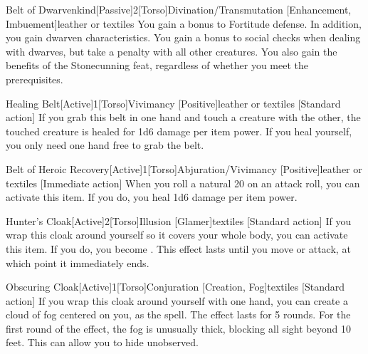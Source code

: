         \begin{magicitemdef}{Belt of Dwarvenkind}[Passive]{2}[Torso]{Divination/Transmutation [Enhancement, Imbuement]}{leather or textiles}
             You gain a  bonus to Fortitude defense.
            In addition, you gain dwarven characteristics.
            You gain a  bonus to social checks when dealing with dwarves, but take a  penalty with all other creatures.
            You also gain the benefits of the Stonecunning feat, regardless of whether you meet the prerequisites.
        \end{magicitemdef}

        \begin{magicitemdef}{Healing Belt}[Active]{1}[Torso]{Vivimancy [Positive]}{leather or textiles}
            [Standard action] If you grab this belt in one hand and touch a creature with the other, the touched creature is healed for 1d6 damage per item power.
            If you heal yourself, you only need one hand free to grab the belt.
        \end{magicitemdef}

        \begin{magicitemdef}{Belt of Heroic Recovery}[Active]{1}[Torso]{Abjuration/Vivimancy [Positive]}{leather or textiles}
            [Immediate action] When you roll a natural 20 on an attack roll, you can activate this item. If you do, you heal 1d6 damage per item power.
        \end{magicitemdef}

        \begin{magicitemdef}{Hunter's Cloak}[Active]{2}[Torso]{Illusion [Glamer]}{textiles}
            [Standard action] If you wrap this cloak around yourself so it covers your whole body, you can activate this item.
            If you do, you become .
            This effect lasts until you move or attack, at which point it immediately ends.
        \end{magicitemdef}

        \begin{magicitemdef}{Obscuring Cloak}[Active]{1}[Torso]{Conjuration [Creation, Fog]}{textiles}
            [Standard action] If you wrap this cloak around yourself with one hand, you can create a cloud of fog centered on you, as the  spell.
            The effect lasts for 5 rounds.
            For the first round of the effect, the fog is unusually thick, blocking all sight beyond 10 feet.
            This can allow you to hide unobserved.
        \end{magicitemdef}

